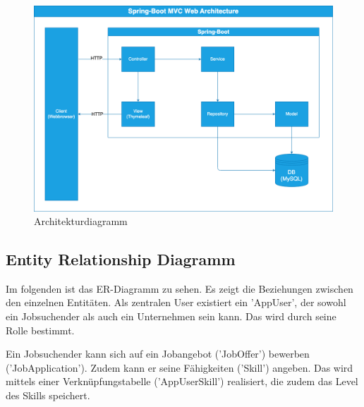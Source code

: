 \documentclass[12pt, letterpaper]{article}
\begin{document}
    \begin{figure}[htbp]
        \includegraphics[width = \linewidth]{Architektur.png}
        \caption{Architekturdiagramm}
        \label{fig:Architektur}
    \end{figure}
    

    \subsection{Entity Relationship Diagramm}

    Im folgenden ist das ER-Diagramm zu sehen. Es zeigt die Beziehungen zwischen den einzelnen Entitäten.
    Als zentralen User existiert ein 'AppUser', der sowohl ein Jobsuchender als auch ein Unternehmen sein kann.
    Das wird durch seine Rolle bestimmt. 
    
    Ein Jobsuchender kann sich auf ein Jobangebot ('JobOffer') bewerben ('JobApplication'). Zudem kann er 
    seine Fähigkeiten ('Skill') angeben. Das wird mittels einer Verknüpfungstabelle ('AppUserSkill') realisiert, die zudem
    das Level des Skills speichert.
\end{document}
